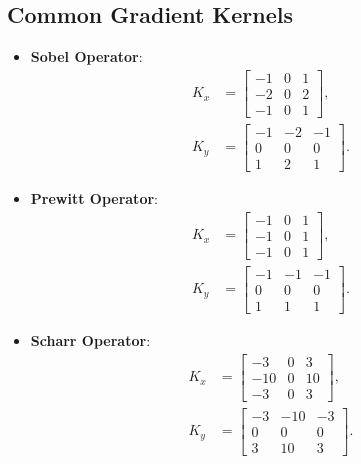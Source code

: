 \begin{notechapter}
\subsection{Common Gradient Kernels}
\begin{itemize}
    \item \textbf{Sobel Operator}:
        \begin{align*}
            K_x &= \begin{bmatrix}
                    -1 & 0 & 1 \\
                    -2 & 0 & 2 \\
                    -1 & 0 & 1
                  \end{bmatrix}, \\
            K_y &= \begin{bmatrix}
                    -1 & -2 & -1 \\
                     0 &  0 &  0 \\
                     1 &  2 &  1
                  \end{bmatrix}.
        \end{align*}
    \item \textbf{Prewitt Operator}:
        \begin{align*}
            K_x &= \begin{bmatrix}
                    -1 & 0 & 1 \\
                    -1 & 0 & 1 \\
                    -1 & 0 & 1
                  \end{bmatrix}, \\
            K_y &= \begin{bmatrix}
                    -1 & -1 & -1 \\
                     0 &  0 &  0 \\
                     1 &  1 &  1
                  \end{bmatrix}.
        \end{align*}
    \item \textbf{Scharr Operator}:
        \begin{align*}
            K_x &= \begin{bmatrix}
                    -3 & 0 &  3 \\
                    -10 & 0 & 10 \\
                    -3 & 0 &  3
                  \end{bmatrix}, \\
            K_y &= \begin{bmatrix}
                    -3 & -10 & -3 \\
                     0 &   0 &  0 \\
                     3 &  10 &  3
                  \end{bmatrix}.
        \end{align*}
\end{itemize}


\end{notechapter}
